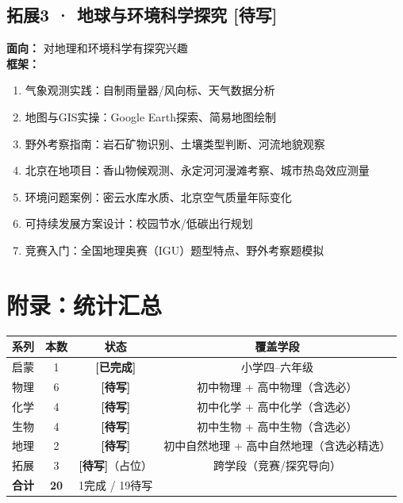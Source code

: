 \documentclass[a4paper,12pt]{ctexart}
\newcommand{\done}{\textcolor{donegreen}{\textbf{[已完成]}}}
\newcommand{\plan}{\textcolor{planblue}{\textbf{[待写]}}}
\begin{document}
\subsection*{拓展3 · 地球与环境科学探究 \plan}

\textbf{面向：} 对地理和环境科学有探究兴趣\\
\textbf{框架：}
\begin{enumerate}
  \item 气象观测实践：自制雨量器/风向标、天气数据分析
  \item 地图与GIS实操：Google Earth探索、简易地图绘制
  \item 野外考察指南：岩石矿物识别、土壤类型判断、河流地貌观察
  \item 北京在地项目：香山物候观测、永定河河漫滩考察、城市热岛效应测量
  \item 环境问题案例：密云水库水质、北京空气质量年际变化
  \item 可持续发展方案设计：校园节水/低碳出行规划
  \item 竞赛入门：全国地理奥赛（IGU）题型特点、野外考察题模拟
\end{enumerate}

\newpage

\section*{\textcolor{blue!70!black}{附录：统计汇总}}

\begin{center}
\begin{tabular}{|l|c|c|c|}
\hline
\textbf{系列} & \textbf{本数} & \textbf{状态} & \textbf{覆盖学段} \\
\hline
启蒙 & 1 & \done & 小学四--六年级 \\
\hline
物理 & 6 & \plan & 初中物理 + 高中物理（含选必） \\
化学 & 4 & \plan & 初中化学 + 高中化学（含选必） \\
生物 & 4 & \plan & 初中生物 + 高中生物（含选必） \\
地理 & 2 & \plan & 初中自然地理 + 高中自然地理（含选必精选） \\
\hline
拓展 & 3 & \plan（占位） & 跨学段（竞赛/探究导向） \\
\hline
\textbf{合计} & \textbf{20} & 1完成 / 19待写 & \\
\hline
\end{tabular}
\end{center}
\end{document}
